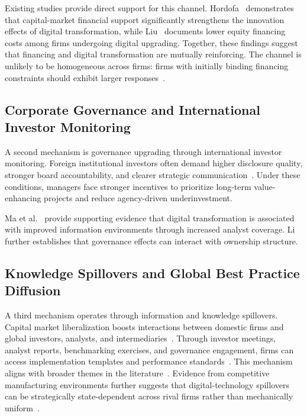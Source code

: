 Existing studies provide direct support for this channel. Hordofa~\cite{Hordofa2024} demonstrates that capital-market financial support significantly strengthens the innovation effects of digital transformation, while Liu~\cite{YLiu2024} documents lower equity financing costs among firms undergoing digital upgrading. Together, these findings suggest that financing and digital transformation are mutually reinforcing. The channel is unlikely to be homogeneous across firms: firms with initially binding financing constraints should exhibit larger responses~\cite{Huang2023}.

\subsection{Corporate Governance and International Investor Monitoring}

A second mechanism is governance upgrading through international investor monitoring. Foreign institutional investors often demand higher disclosure quality, stronger board accountability, and clearer strategic communication~\cite{Chen2025}. Under these conditions, managers face stronger incentives to prioritize long-term value-enhancing projects and reduce agency-driven underinvestment.

Ma et al.~\cite{Ma2025} provide supporting evidence that digital transformation is associated with improved information environments through increased analyst coverage. Li~\cite{CLi2023} further establishes that governance effects can interact with ownership structure.

\subsection{Knowledge Spillovers and Global Best Practice Diffusion}

A third mechanism operates through information and knowledge spillovers. Capital market liberalization boosts interactions between domestic firms and global investors, analysts, and intermediaries~\cite{Zheng2021,Zhu2023}. Through investor meetings, analyst reports, benchmarking exercises, and governance engagement, firms can access implementation templates and performance standards~\cite{Sun2022}. This mechanism aligns with broader themes in the literature~\cite{HLiu2024,LiShen2021,WangWang2026}. Evidence from competitive manufacturing environments further suggests that digital-technology spillovers can be strategically state-dependent across rival firms rather than mechanically uniform~\cite{LiuGu2026}.

